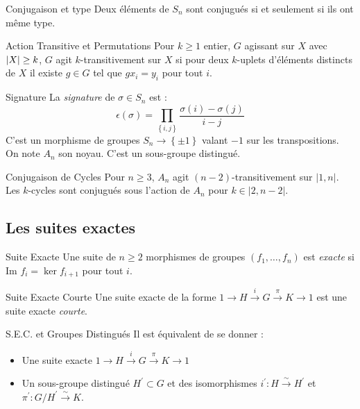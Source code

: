 \documentclass{cours}
\begin{document}
\begin{propositionfr}{Conjugaison et type}{}
    Deux éléments de $S_{n}$ sont conjugués si et seulement si ils ont même type.
\end{propositionfr}

\begin{définition}{Action Transitive et Permutations}{}
    Pour $k\geq 1$ entier, $G$ agissant sur $X$ avec $\left|X\right| \geq k$, $G$ agit $k$-transitivement sur $X$ si pour deux $k$-uplets d'éléments distincts de $X$ il existe $g \in G$ tel que $gx_{i} = y_{i}$ pour tout $i$.
\end{définition}

\begin{définition}{Signature}{}
    La \emph{signature} de $\sigma \in S_{n}$ est :
    \[
        \epsilon(\sigma) = \prod_{\left\{i, j\right\}} \frac{\sigma(i) - \sigma(j)}{i - j}
    \]
    C'est un morphisme de groupes $S_{n} \rightarrow \left\{\pm 1\right\}$ valant $-1$ sur les transpositions. On note $A_{n}$ son noyau. C'est un sous-groupe distingué.
\end{définition}

\begin{propositionfr}{Conjugaison de Cycles}{}
    Pour $n \geq 3$, $A_{n}$ agit $\left(n - 2\right)$-transitivement sur $\lvert 1, n \rvert$. Les $k$-cycles sont conjugués sous l'action de $A_n$ pour $k \in \lvert 2, n-2 \rvert$.
\end{propositionfr}

\subsection{Les suites exactes}
\begin{définition}{Suite Exacte}{}
    Une suite de $n \geq 2$ morphismes de groupes $(f_{1}, \ldots, f_{n})$ est \emph{exacte} si $\text{Im } f_{i} = \ker f_{i+1}$ pour tout $i$.
\end{définition}

\begin{définition}{Suite Exacte Courte}{}
    Une suite exacte de la forme $1 \rightarrow H \xrightarrow{i} G \xrightarrow{\pi} K \rightarrow 1$ est une suite exacte \emph{courte}.
\end{définition}

\begin{propositionfr}{S.E.C. et Groupes Distingués}{}
    Il est équivalent de se donner :
    \begin{itemize}
        \item Une suite exacte $1 \rightarrow H \xrightarrow{i} G \xrightarrow{\pi} K \rightarrow 1$
        \item Un sous-groupe distingué $H^{'} \subset G$ et des isomorphismes $i^{'} : H \xrightarrow{\sim} H^{'}$ et $\pi^{'} : G/H^{'} \xrightarrow{\sim} K$.
    \end{itemize}
\end{propositionfr}
\end{document}
